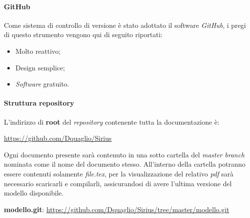 \paragraph{GitHub}
Come sistema di controllo di versione è stato adottato il software \textit{GitHub}, i pregi di questo strumento vengono qui di seguito riportati:
\begin{itemize}
\item Molto reattivo;
\item Design semplice; 
\item \textit{Software} gratuito.
\end{itemize}

\paragraph{Struttura repository}
L'indirizzo di \textbf{root} del \textit{repository} contenente tutta la documentazione è:
\begin{center}
\href{https://github.com/Dquaglio/Sirius}{https://github.com/Dquaglio/Sirius}
\end{center}

Ogni documento presente sarà contenuto in una sotto cartella del \textit{master branch} nominata come il nome del documento stesso.
All'interno della cartella potranno essere contenuti solamente \textit{file.tex}, per la visualizzazione del relativo \textit{pdf} sarà necessario scaricarli e compilarli, assicurandosi di avere l'ultima versione del modello disponibile.
\begin{center}
\textbf{modello.git}: \href{https://github.com/Dquaglio/Sirius/tree/master/modello.git}{https://github.com/Dquaglio/Sirius/tree/master/modello.git}
\end{center}


